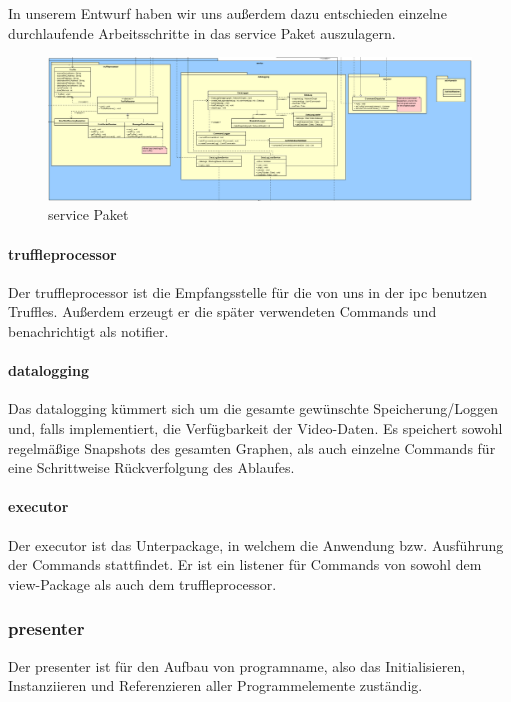 In unserem Entwurf haben wir uns außerdem dazu entschieden einzelne
durchlaufende Arbeitsschritte in das service Paket auszulagern.\newline

\begin{figure}[H]
  \centering
  \includegraphics[width=\textwidth]{../diagramimages/service.png}
  \caption{service Paket}
  \medskip
\end{figure}

    \paragraph{truffleprocessor}
    Der truffleprocessor ist die Empfangsstelle für die von uns in der
    \gls{ipc} benutzen Truffles. Außerdem erzeugt er die später verwendeten
    Commands und benachrichtigt als \gls{notifier}.

    \paragraph{datalogging}
    Das datalogging kümmert sich um die gesamte gewünschte
    Speicherung/Loggen und, falls implementiert, die Verfügbarkeit der
    Video-Daten. Es speichert sowohl regelmäßige Snapshots des gesamten
    Graphen, als auch einzelne Commands für eine Schrittweise Rückverfolgung
    des Ablaufes.

    \paragraph{executor}
    Der executor ist das Unterpackage, in welchem die Anwendung bzw.
    Ausführung der Commands stattfindet. Er ist ein \gls{listener} für Commands
    von sowohl dem view-Package als auch dem truffleprocessor.


\subsubsection{presenter}


Der presenter ist für den Aufbau von \gls{programname}, also das
Initialisieren, Instanziieren und Referenzieren aller Programmelemente zuständig.

